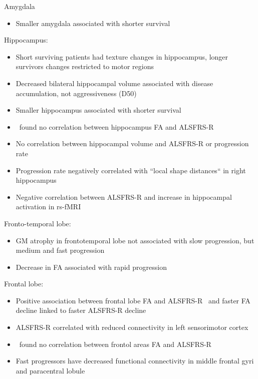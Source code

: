 Amygdala
\begin{itemize}
    \item Smaller amygdala associated with shorter survival~\cite{westenengSubcorticalStructuresAmyotrophic2015}
\end{itemize}




Hippocampus:
\begin{itemize}
    \item Short surviving patients had texture changes in hippocampus, longer survivors changes restricted to motor regions~\cite{ishaqueEvaluatingCerebralCorrelates2018}
    \item Decreased bilateral hippocampal volume associated with disease accumulation, not aggressiveness (D50)~\cite{dieckmannCorticalSubcorticalGrey2022}
    \item Smaller hippocampus associated with shorter survival~\cite{westenengSubcorticalStructuresAmyotrophic2015}
    \item \cite{mullerLargescaleMulticentreCerebral2016}~found no correlation between hippocampus FA and ALSFRS-R
    \item No correlation between hippocampal volume and ALSFRS-R or progression rate~\cite{abdullaHippocampalDegenerationPatients2014}
    \item Progression rate negatively correlated with ``local shape distances`` in right hippocampus~\cite{taeShapeAnalysisSubcortical2020}
    \item Negative correlation between ALSFRS-R and increase in hippocampal activation in rs-fMRI~\cite{stoppelStructuralFunctionalHallmarks2014}
\end{itemize}

Fronto-temporal lobe:
\begin{itemize}
    \item GM atrophy in frontotemporal lobe not associated with slow progression, but medium and fast progression~\cite{sendaStructuralMRICorrelates2017}
    \item Decrease in FA associated with rapid progression~\cite{sendaStructuralMRICorrelates2017}
\end{itemize}

Frontal lobe:
\begin{itemize}
    \item Positive association between frontal lobe FA and ALSFRS-R~\cite{kalraProspectiveHarmonizedMulticenter2020} and faster FA decline linked to faster ALSFRS-R decline
    \item ALSFRS-R correlated with reduced connectivity in left sensorimotor cortex~\cite{agostaSensorimotorFunctionalConnectivity2011}
    \item \cite{mullerLargescaleMulticentreCerebral2016}~found no correlation between frontol areas FA and ALSFRS-R
    \item Fast progressors have decreased functional connectivity in middle frontal gyri and paracentral lobule~\cite{trojsiRestingStateFunctional2021}
\end{itemize}

